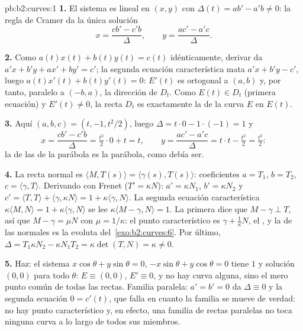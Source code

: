 \begin{solution}{pb:b2:curves:1}
\textbf{1.} El sistema es lineal en $(x, y)$ con 
$\Delta(t) = a b' - a'b \neq 0$: la regla de Cramer da la única
solución
\[
x = \frac{c b' - c' b}{\Delta}, \qquad
y = \frac{a c' - a' c}{\Delta}.
\]

\textbf{2.} Como $a(t)x(t) + b(t)y(t) = c(t)$ idénticamente, derivar
da $a'x + b'y + ax' + by' = c'$; la segunda ecuación característica
mata $a'x + b'y - c'$, luego $a(t)x'(t) + b(t)y'(t) = 0$: $E'(t)$ es
ortogonal a $(a, b)$ y, por tanto, paralelo a $(-b, a)$, la dirección
de $D_t$. Como $E(t) \in D_t$ (primera ecuación) y $E'(t) \neq 0$, la
recta $D_t$ es exactamente la  de la curva $E$ en
$E(t)$.

\textbf{3.} Aquí $(a, b, c) = (t, -1, t^2/2)$, luego $\Delta =
t\cdot0 - 1\cdot(-1) = 1$ y
\[
x = \frac{c b' - c' b}{\Delta} = \tfrac{t^2}2\cdot 0 +
t = t, \qquad
y = \frac{a c' - a' c}{\Delta} = t\cdot t - \tfrac{t^2}2 =
\tfrac{t^2}2 :
\]
la  de las  de la parábola es la parábola,
como debía ser.

\textbf{4.} La recta normal es $\langle M, T(s)\rangle =
\langle\gamma(s), T(s)\rangle$: coeficientes $a = T_1$, $b = T_2$, $c
= \langle\gamma, T\rangle$. Derivando con Frenet ($T' = \kappa N$):
$a' = \kappa N_1$, $b' = \kappa N_2$ y $c' = \langle T, T\rangle +
\langle\gamma, \kappa N\rangle = 1 + \kappa\langle\gamma, N\rangle$.
La segunda ecuación característica $\kappa\langle M, N\rangle = 1 +
\kappa\langle\gamma, N\rangle$ se lee $\kappa\langle M - \gamma,
N\rangle = 1$. La primera dice que $M - \gamma \perp T$, así que $M -
\gamma = \mu N$ con $\mu = 1/\kappa$: el punto característico es
$\gamma + \frac1\kappa N$, el , y la
 de las normales es la evoluta del~\cref{exo:b2:curves:6}. Por último, $\Delta = T_1\kappa N_2 - \kappa
N_1 T_2 = \kappa\det(T, N) = \kappa \neq 0$.

\textbf{5.} Haz: el sistema $x\cos\theta + y\sin\theta = 0$,
$-x\sin\theta + y\cos\theta = 0$ tiene  $1$ y solución
$(0,0)$ para todo $\theta$: $E \equiv (0,0)$, $E' \equiv 0$, y no hay
curva alguna, sino el mero punto común de todas las rectas. Familia
paralela: $a' = b' = 0$ da $\Delta \equiv 0$ y la segunda ecuación $0
= c'(t)$, que falla en cuanto la familia se mueve de verdad: no hay
punto característico y, en efecto, una familia de rectas paralelas no
toca ninguna curva a lo largo de todos sus miembros.


\end{solution}

